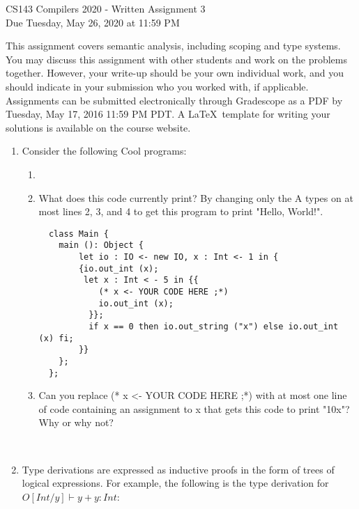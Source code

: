 \documentclass[11pt]{article}
\begin{document}
\begin{center}
\LARGE CS143 Compilers 2020 - Written Assignment 3 \\
\large Due Tuesday, May 26, 2020 at 11:59 PM
\end{center}

This assignment covers semantic analysis, including scoping and type systems. You may discuss this assignment with other students and work on the problems together. However, your write-up should be your own individual work, and you should indicate in your submission who you worked with, if applicable. Assignments can be submitted electronically through Gradescope as a PDF by Tuesday, May 17, 2016 11:59 PM PDT. A \LaTeX \ template for writing your solutions is available on the course website.

\begin{enumerate}
  \item Consider the following Cool programs:
  \begin{enumerate}
  \begin{lstlisting}
    class A {
        x: A; -- line 2
        baz() : A {{x <- new A; x;}}; -- line 3
        bar(): A {new A}; -- line 4
        foo(): String {"World!"};
    }; 
    class B inherits A {
        foo() : String {" "};
    };
    
    class C inherits A {
        foo() : String {"Hello,"};
    };
    
    class Main {
        main (): Object {
            let io : IO <- new IO, b : B <- new B, c : C <- new C in {{
                io.out_string (c.baz().foo());
                io.out_string(b.baz().baz().foo());
                io.out_string (b.bar().baz().foo());
            }} 
        };
    };
    
  \end{lstlisting}
        \item \item What does this code currently print? By changing only the A types on at most lines 2, 3, and 4 to get this program to print "Hello, World!".  \\
        \newpage
  \begin{lstlisting}
  class Main {
    main (): Object {
        let io : IO <- new IO, x : Int <- 1 in {
        {io.out_int (x);
         let x : Int < - 5 in {{
            (* x <- YOUR CODE HERE ;*)
            io.out_int (x);
          }};
          if x == 0 then io.out_string ("x") else io.out_int (x) fi;
        }}
    };
  };
  \end{lstlisting}
  \item Can you replace (* x <- YOUR CODE HERE ;*) with at most one line of code containing an assignment to x that gets this code to print "10x"? Why or why not?
  \end{enumerate}\\
        \newpage
  \item Type derivations are expressed as inductive proofs in the form of trees of logical expressions. For example, the following is the type derivation for $O[Int/y] \vdash y + y: Int$: \\
  

\end{enumerate}
\end{document}
